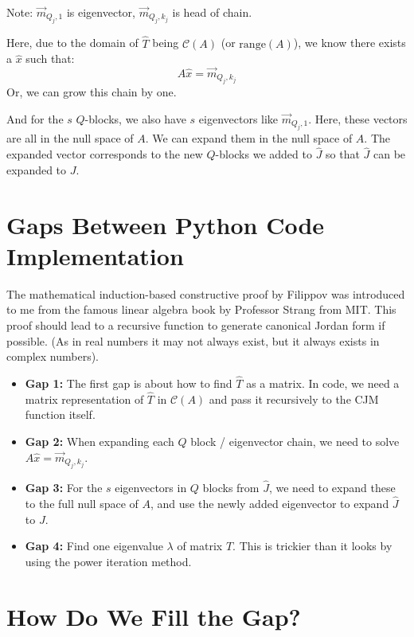 \documentclass[12pt, a4paper]{article}
\begin{document}
Note: $\vec{m}_{Q_j, 1}$ is eigenvector, $\vec{m}_{Q_j, k_j}$ is head of chain.

Here, due to the domain of $\hat{T}$ being $\mathcal{C}(A)$ (or $\text{range}(A)$), we know there exists a $\hat{x}$ such that:
\[
A\hat{x} = \vec{m}_{Q_j, k_j}
\]
Or, we can grow this chain by one.

\vspace{1em}
And for the $s$ $Q$-blocks, we also have $s$ eigenvectors like $\vec{m}_{Q_j, 1}$. Here, these vectors are all in the null space of $A$. We can expand them in the null space of $A$. The expanded vector corresponds to the new $Q$-blocks we added to $\hat{J}$ so that $\hat{J}$ can be expanded to $J$.

\vspace{2em}

\section*{\color{primary} Gaps Between Python Code Implementation}

The mathematical induction-based constructive proof by Filippov was introduced to me from the famous linear algebra book by Professor Strang from MIT. This proof should lead to a recursive function to generate canonical Jordan form if possible. (As in real numbers it may not always exist, but it always exists in complex numbers).

\begin{itemize}[leftmargin=1.5em]
    \item \textbf{Gap 1:} The first gap is about how to find $\hat{T}$ as a matrix. In code, we need a matrix representation of $\hat{T}$ in $\mathcal{C}(A)$ and pass it recursively to the CJM function itself.
    \item \textbf{Gap 2:} When expanding each $Q$ block / eigenvector chain, we need to solve $A\hat{x} = \vec{m}_{Q_j, k_j}$.
    \item \textbf{Gap 3:} For the $s$ eigenvectors in $Q$ blocks from $\hat{J}$, we need to expand these to the full null space of $A$, and use the newly added eigenvector to expand $\hat{J}$ to $J$.
    \item \textbf{Gap 4:} Find one eigenvalue $\lambda$ of matrix $T$. This is trickier than it looks by using the power iteration method.
\end{itemize}

\section*{\color{primary} How Do We Fill the Gap?}
\end{document}
